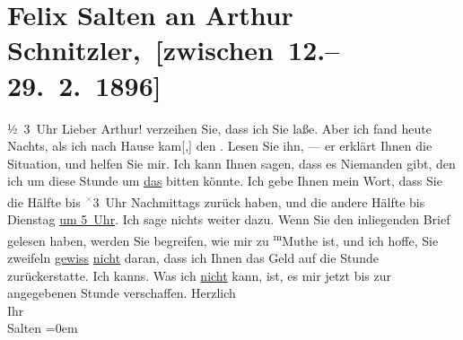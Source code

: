 

         
         \renewcommand{\erwaehntePersonen}{Personen: Felix Salten}
         \renewcommand{\erwaehnteOrte}{Orte: Berlin, Wien}
         \renewcommand{\erwaehnteWerke}{}
               \section[ Felix Salten an Arthur Schnitzler, {[}zwischen 12.–29. 2. 1896{]}]{ Felix Salten an Arthur Schnitzler, {[}zwischen 12.–29. 2. 1896{]}}\nopagebreak{}\rehead{ }\begin{ledgroupsized}[t]{13cm}\normalsize\beginnumbering \toendnotes[C]{\smallbreak\pagebreak[2]} 
\toendnotes[C]{\smallbreak}\pstart
           \raggedleft{}{\pb}½ 3 Uhr\pend
           \pstart
           Lieber Arthur! verzeihen Sie, dass ich Sie \label{K_L03168-1v}\label{K_L03168-1h} laße. Aber ich fand heute{ }Nachts, als ich nach Hause kam{[},{]} den \label{K_L03168-2v}\label{K_L03168-2h}. Lesen Sie ihn, — er erklärt
               Ihnen die Situation, und helfen Sie mir. Ich kann Ihnen sagen, dass es Niemanden
               gibt, den ich um diese Stunde um \uline{das} bitten könnte.
               Ich gebe Ihnen mein Wort, dass Sie die Hälfte bis \substVorne{}\textsuperscript{\textcolor{gray}{×}}\substDazwischen{}3\substHinten{} Uhr Nachmittags zurück haben, und die andere Hälfte bis
                  Dienstag{ }{\pb}\uline{um 5 Uhr}. Ich sage nichts weiter dazu. Wenn Sie den inliegenden Brief gelesen haben,
               werden Sie begreifen, wie mir zu \substVorne{}\textsuperscript{m}\substDazwischen{}M\substHinten{}uthe ist, und ich hoffe, Sie zweifeln \uline{gewiss}{ }\uline{nicht} daran, dass ich Ihnen das Geld auf die Stunde
               zurückerstatte. Ich kanns. Was ich \uline{nicht} kann, ist,
               es mir jetzt bis zur angegebenen Stunde verschaffen.\pend
           \pstart
           Herzlich {\\[\baselineskip]}Ihr {\\[\baselineskip]}\spacefill\mbox{Salten}\pend
           \leftskip=0em{}
         

\end{ledgroupsized}
